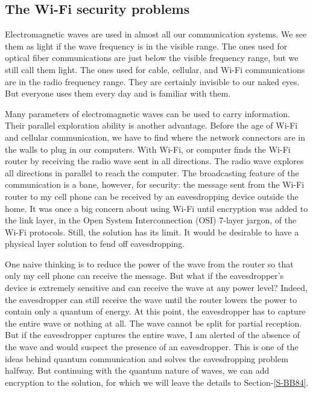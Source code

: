 \documentclass[oneside, letter, 12pt]{book}
\begin{document}
\subsection{The Wi-Fi security problems}\label{Sec-example-wifi}
Electromagnetic waves are used in almost all our communication systems. We see them as light if the wave frequency is in the visible range. The ones used for optical fiber communications are just below the visible frequency range, but we still call them light. The ones used for cable, cellular, and Wi-Fi communications are in the radio frequency range. They are certainly invisible to our naked eyes. But everyone uses them every day and is familiar with them.

Many parameters of electromagnetic waves can be used to carry information. Their parallel exploration ability is another advantage. Before the age of Wi-Fi and cellular communication, we have to find where the network connectors are in the walls to plug in our computers. With Wi-Fi, or computer finds the Wi-Fi router by receiving the radio wave sent in all directions. The radio wave explores all directions in parallel to reach the computer. The broadcasting feature of the communication is a bane, however, for security: the message sent from the Wi-Fi router to my cell phone can be received by an eavesdropping device outside the home. It was once a big concern about using Wi-Fi until encryption was added to the link layer, in the Open System Interconnection (OSI) 7-layer jargon, of the Wi-Fi protocols. Still, the solution has its limit. It would be desirable to have a physical layer solution to fend off eavesdropping.

One naive thinking is to reduce the power of the wave from the router so that only my cell phone can receive the message. But what if the eavesdropper's device is extremely sensitive and can receive the wave at any power level? Indeed, the eavesdropper can still receive the wave until the router lowers the power to contain only a quantum of energy. At this point, the eavesdropper has to capture the entire wave or nothing at all. The wave cannot be split for partial reception. But if the eavesdropper captures the entire wave, I am alerted of the absence of the wave and would suspect the presence of an eavesdropper. This is one of the ideas behind quantum communication and solves the eavesdropping problem halfway. But continuing with the quantum nature of waves, we can add encryption to the solution, for which we will leave the details to Section-\ref{S-BB84}.
\end{document}
